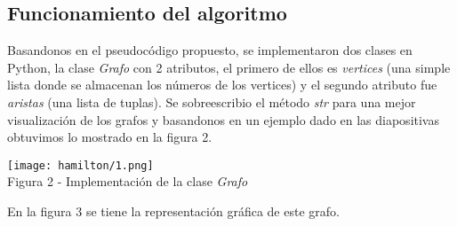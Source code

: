 \documentclass[12pt,twoside]{article}
\begin{document}
\subsection{Funcionamiento del algoritmo}
Basandonos en el pseudocódigo propuesto, se implementaron dos clases en Python, la clase \textit{Grafo} con 2 atributos, el primero de ellos es \textit{vertices} (una simple lista donde se almacenan los números de los vertices) y el segundo atributo fue \textit{aristas} (una lista de tuplas). Se sobreescribio el método \textit{str} para una mejor visualización de los grafos y basandonos en un ejemplo dado en las diapositivas obtuvimos lo mostrado en la figura 2.
\begin{center}
    \texttt{[image: hamilton/1.png]}\\
    Figura 2 - Implementación de la clase \textit{Grafo}
\end{center}
En la figura 3 se tiene la representación gráfica de este grafo.
\end{document}
